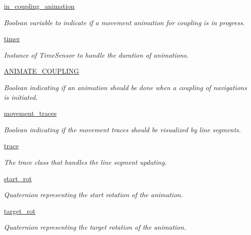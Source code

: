 \begin{DoxyCompactItemize}
\hyperlink{classlib_1_1Navigation_1_1Navigation_ae354c4f9412c29849e814e21a91a5591}{in\-\_\-coupling\-\_\-animation}
\begin{DoxyCompactList}\small\item\em \-Boolean variable to indicate if a movement animation for coupling is in progress. \end{DoxyCompactList}\item 
\hyperlink{classlib_1_1Navigation_1_1Navigation_a67d4e57b17c3abd41aefa0a1861a0891}{timer}
\begin{DoxyCompactList}\small\item\em \-Instance of \-Time\-Sensor to handle the duration of animations. \end{DoxyCompactList}\item 
\hyperlink{classlib_1_1Navigation_1_1Navigation_a5c3fbda73c36d7dd544712c2d4298033}{\-A\-N\-I\-M\-A\-T\-E\-\_\-\-C\-O\-U\-P\-L\-I\-N\-G}
\begin{DoxyCompactList}\small\item\em \-Boolean indicating if an animation should be done when a coupling of navigations is initiated. \end{DoxyCompactList}\item 
\hyperlink{classlib_1_1Navigation_1_1Navigation_a95095397df146e371899a47701f544ff}{movement\-\_\-traces}
\begin{DoxyCompactList}\small\item\em \-Boolean indicating if the movement traces should be visualized by line segments. \end{DoxyCompactList}\item 
\hyperlink{classlib_1_1Navigation_1_1Navigation_a88dc76b6afbdcc89d772e45cb2e16196}{trace}
\begin{DoxyCompactList}\small\item\em \-The trace class that handles the line segment updating. \end{DoxyCompactList}\item 
\hyperlink{classlib_1_1Navigation_1_1Navigation_a516572669ba2af5be532e1d9b5a121fc}{start\-\_\-rot}
\begin{DoxyCompactList}\small\item\em \-Quaternion representing the start rotation of the animation. \end{DoxyCompactList}\item 
\hyperlink{classlib_1_1Navigation_1_1Navigation_a1d6a3cee52e37dc1975ff09e1843da99}{target\-\_\-rot}
\begin{DoxyCompactList}\small\item\em \-Quaternion representing the target rotation of the animation. \end{DoxyCompactList}\item 

\end{DoxyCompactItemize}

